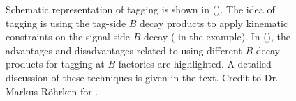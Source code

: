 \begin{figure}[hbtp!]
    \centering
    \subcaptionbox{\label{fig:tagging_schematic}}{
        \resizebox{0.3\textwidth}{!}{
            
            }
    }
    \caption{\label{fig:tagging_drawins} Schematic representation of tagging is shown in ().
    The idea of tagging is using the tag-side $B$ decay products to apply kinematic constraints on the signal-side $B$ decay (\mbox{\BtoXsgamma} in the example).
    In (), the advantages and disadvantages related to using different $B$ decay products for tagging at $B$ factories are highlighted.
    A detailed discussion of these techniques is given in the text.
    Credit to Dr. Markus Röhrken for .}
\end{figure}

